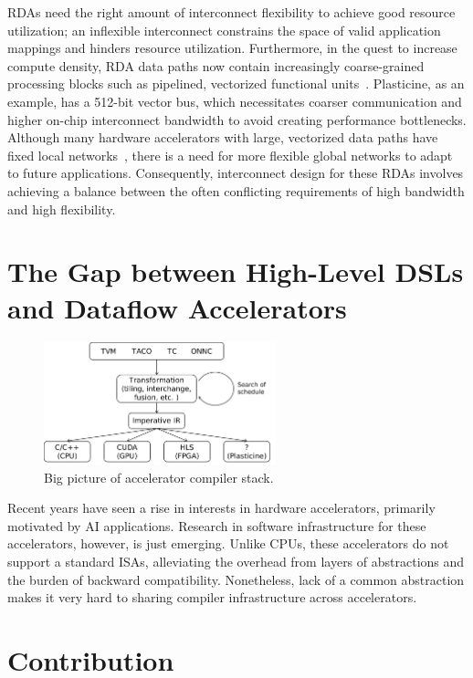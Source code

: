 RDAs need the right amount of interconnect flexibility to achieve good resource utilization; 
an inflexible interconnect constrains the space of
valid application mappings and hinders resource utilization. 
Furthermore, 
in the quest to increase compute density, RDA data paths now 
contain increasingly coarse-grained processing blocks such as pipelined, vectorized functional 
units~\cite{plasticine, piperench, xilinx-acap}.
Plasticine, as an example, has a 512-bit vector bus, which necessitates coarser communication and higher on-chip interconnect bandwidth to avoid creating performance bottlenecks. 
Although many hardware accelerators with large, vectorized data paths have fixed local networks~\cite{brainwave}, there is a need for more
flexible global networks to adapt to future applications.
Consequently, interconnect design for these RDAs involves achieving a balance between the often conflicting requirements of high bandwidth and high flexibility.

\section{The Gap between High-Level DSLs and Dataflow Accelerators}

\begin{figure}
\centering
\includegraphics[width=0.6\textwidth]{figs/highlevel.pdf}
\caption[Big picture of accelerator compiler stack]{
  Big picture of accelerator compiler stack.
}
\label{fig:bigpic}
\end{figure}

Recent years have seen a rise in interests in hardware accelerators, primarily motivated by AI applications. 
Research in software infrastructure for these accelerators, however, is just emerging.
Unlike CPUs, these accelerators do not support a standard ISAs, alleviating the overhead from
layers of abstractions and the burden of backward compatibility. 
Nonetheless, lack of a common abstraction makes it very hard to sharing compiler infrastructure
across accelerators. 

\section{Contribution}

